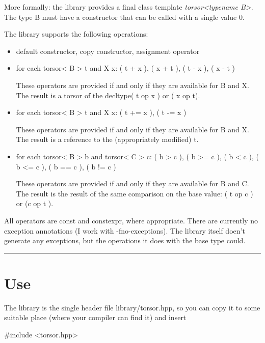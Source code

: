 \documentclass[]{article}
\newenvironment{Shaded}{}{}
\newcommand{\ImportTok}[1]{#1}
\newcommand{\PreprocessorTok}[1]{\textcolor[rgb]{0.74,0.48,0.00}{#1}}
\begin{document}
More formally: the library provides a final class template
\emph{torsor\textless{}typename B\textgreater{}}. The type B must have a
constructor that can be called with a single value 0.

The library supports the following operations:

\begin{itemize}
\item
  default constructor, copy constructor, assignment operator
\item
  for each torsor\textless{} B \textgreater{} t and X x: ( t + x ), ( x
  + t ), ( t - x ), ( x - t )

  These operators are provided if and only if they are available for B
  and X. The result is a torsor of the decltype( t op x ) or ( x op t).
\item
  for each torsor\textless{} B \textgreater{} t and X x: ( t += x ), ( t
  -= x )

  These operators are provided if and only if they are available for B
  and X. The result is a reference to the (appropriately modified) t.
\item
  for each torsor\textless{} B \textgreater{} b and torsor\textless{} C
  \textgreater{} c: ( b \textgreater{} c ), ( b \textgreater{}= c ), ( b
  \textless{} c ), ( b \textless{}= c ), ( b == c ), ( b != c )

  These operators are provided if and only if they are available for B
  and C. The result is the result of the same comparison on the base
  value: ( t op c ) or (c op t ).
\end{itemize}

All operators are const and constexpr, where appropriate. There are
currently no exception annotations (I work with -fno-exceptions). The
library itself doen't generate any exceptions, but the operations it
does with the base type could.

\begin{center}\rule{0.5\linewidth}{\linethickness}\end{center}

\hypertarget{use}{%
\section{Use}\label{use}}

The library is the single header file library/torsor.hpp, so you can
copy it to some suitable place (where your compiler can find it) and
insert

\begin{Shaded}
\begin{Highlighting}[]
\PreprocessorTok{#include }\ImportTok{<torsor.hpp>}
\end{Highlighting}
\end{Shaded}
\end{document}
